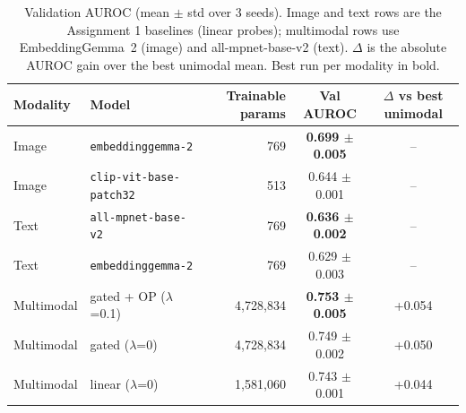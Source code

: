 \begin{table}[t]
\centering
\begin{tabular}{llrcc}
\toprule
Modality & Model & Trainable params & Val AUROC & $\Delta$ vs best unimodal \\
\midrule
Image & \texttt{embeddinggemma-2} & 769 & \textbf{0.699 $\pm$ 0.005} & -- \\
Image & \texttt{clip-vit-base-patch32} & 513 & 0.644 $\pm$ 0.001 & -- \\
\midrule
Text & \texttt{all-mpnet-base-v2} & 769 & \textbf{0.636 $\pm$ 0.002} & -- \\
Text & \texttt{embeddinggemma-2} & 769 & 0.629 $\pm$ 0.003 & -- \\
\midrule
Multimodal & gated + OP ($\lambda$=0.1) & 4,728,834 & \textbf{0.753 $\pm$ 0.005} & +0.054 \\
Multimodal & gated ($\lambda$=0) & 4,728,834 & 0.749 $\pm$ 0.002 & +0.050 \\
Multimodal & linear ($\lambda$=0) & 1,581,060 & 0.743 $\pm$ 0.001 & +0.044 \\
\bottomrule
\end{tabular}
\caption{Validation AUROC (mean $\pm$ std over 3 seeds). Image and text rows are the Assignment 1 baselines (linear probes); multimodal rows use EmbeddingGemma~2 (image) and all-mpnet-base-v2 (text). $\Delta$ is the absolute AUROC gain over the best unimodal mean. Best run per modality in bold.}
\label{tab:results}
\end{table}
